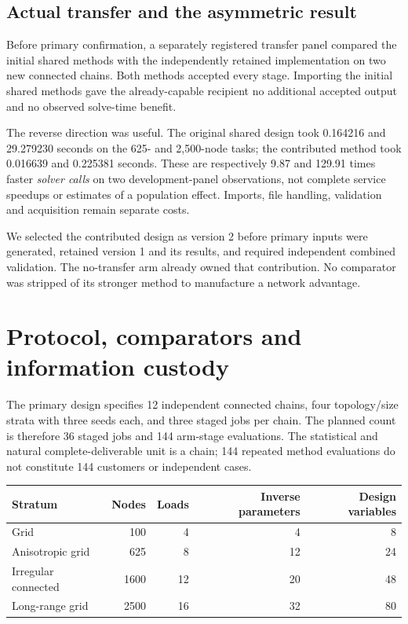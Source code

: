 \documentclass[11pt,letterpaper]{article}
\begin{document}
\subsection{Actual transfer and the asymmetric result}

Before primary confirmation, a separately registered transfer panel compared the initial shared methods with the independently retained implementation on two new connected chains. Both methods accepted every stage. Importing the initial shared methods gave the already-capable recipient no additional accepted output and no observed solve-time benefit.

The reverse direction was useful. The original shared design took 0.164216 and 29.279230 seconds on the 625- and 2,500-node tasks; the contributed method took 0.016639 and 0.225381 seconds. These are respectively 9.87 and 129.91 times faster \emph{solver calls} on two development-panel observations, not complete service speedups or estimates of a population effect. Imports, file handling, validation and acquisition remain separate costs.

We selected the contributed design as version 2 before primary inputs were generated, retained version 1 and its results, and required independent combined validation. The no-transfer arm already owned that contribution. No comparator was stripped of its stronger method to manufacture a network advantage.

\section{Protocol, comparators and information custody}

The primary design specifies 12 independent connected chains, four topology/size strata with three seeds each, and three staged jobs per chain. The planned count is therefore 36 staged jobs and 144 arm-stage evaluations. The statistical and natural complete-deliverable unit is a chain; 144 repeated method evaluations do not constitute 144 customers or independent cases.

\begin{center}
\begin{tabular}{lrrrr}
\toprule
Stratum & Nodes & Loads & Inverse parameters & Design variables\\
\midrule
Grid &100&4&4&8\\
Anisotropic grid &625&8&12&24\\
Irregular connected &1600&12&20&48\\
Long-range grid &2500&16&32&80\\
\bottomrule
\end{tabular}
\end{center}
\end{document}
